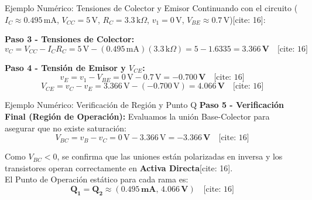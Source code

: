 \documentclass[aspectratio=169]{beamer}
\begin{document}
\begin{frame}{Ejemplo Numérico: Tensiones de Colector y Emisor}
    Continuando con el circuito ($I_C \approx 0.495\,\text{mA}$, $V_{CC}=5\,\text{V}$, $R_C=3.3\,\text{k}\Omega$, $v_1=0\,\text{V}$, $V_{BE}\approx0.7\,\text{V}$)[cite: 16]:
    
    \textbf{Paso 3 - Tensiones de Colector:}
    \begin{equation*}
        v_C = V_{CC} - I_C R_C = 5\,\text{V} - (0.495\,\text{mA})(3.3\,\text{k}\Omega) = 5 - 1.6335 = \mathbf{3.366\,\text{V}} \quad \text{[cite: 16]}
    \end{equation*}
    
    \textbf{Paso 4 - Tensión de Emisor y $V_{CE}$:}
    \begin{equation*}
        v_E = v_1 - V_{BE} = 0\,\text{V} - 0.7\,\text{V} = \mathbf{-0.700\,\text{V}} \quad \text{[cite: 16]}
    \end{equation*}
    \begin{equation*}
        V_{CE} = v_C - v_E = 3.366\,\text{V} - (-0.700\,\text{V}) = \mathbf{4.066\,\text{V}} \quad \text{[cite: 16]}
    \end{equation*}
\end{frame}

\begin{frame}{Ejemplo Numérico: Verificación de Región y Punto Q}
    \textbf{Paso 5 - Verificación Final (Región de Operación):}
    Evaluamos la unión Base-Colector para asegurar que no existe saturación:
    \begin{equation*}
        V_{BC} = v_B - v_C = 0\,\text{V} - 3.366\,\text{V} = \mathbf{-3.366\,\text{V}} \quad \text{[cite: 16]}
    \end{equation*}
    
    \begin{tcolorbox}[colback=green!5, colframe=green!50!black, title=\textbf{Conclusión Matemática}]
        Como $V_{BC} < 0$, se confirma que las uniones están polarizadas en inversa y los transistores operan correctamente en \textbf{Activa Directa}[cite: 16]. \\
        El Punto de Operación estático para cada rama es:
        \begin{equation*}
            \mathbf{Q_1 = Q_2 \approx (0.495\,\text{mA},\, 4.066\,\text{V})} \quad \text{[cite: 16]}
        \end{equation*}
    \end{tcolorbox}
\end{frame}
\end{document}
